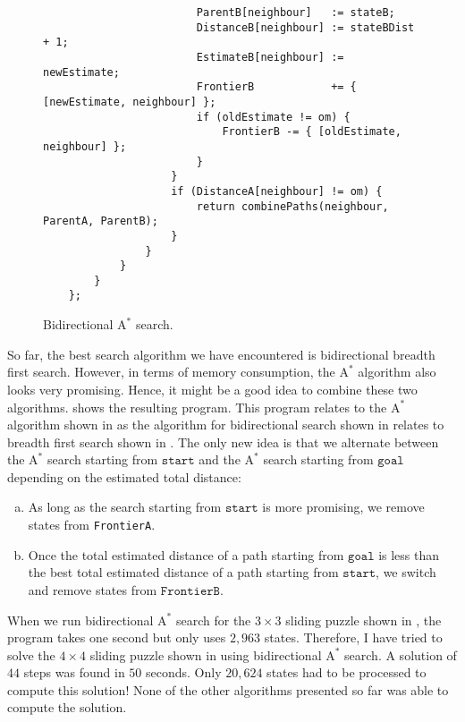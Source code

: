 \begin{figure}[!ht]
\begin{Verbatim}
                        ParentB[neighbour]   := stateB;
                        DistanceB[neighbour] := stateBDist + 1;
                        EstimateB[neighbour] := newEstimate;
                        FrontierB            += { [newEstimate, neighbour] };
                        if (oldEstimate != om) { 
                            FrontierB -= { [oldEstimate, neighbour] }; 
                        }
                    }
                    if (DistanceA[neighbour] != om) {
                        return combinePaths(neighbour, ParentA, ParentB);
                    }
                }
            }
        }
    };
\end{Verbatim}
\vspace*{-0.3cm}
\caption{Bidirectional $\mathrm{A}^*$ search.}
\label{fig:a-star-bidirectional.stlx}
\end{figure}
\noindent
So far, the best search algorithm we have encountered is bidirectional breadth first search.  However, in terms
of memory consumption, the $\mathrm{A}^*$ algorithm also looks very promising.  Hence, it might be a good idea
to combine these two algorithms.   shows the resulting program.  This program
relates to the $\mathrm{A}^*$ algorithm shown in  as the algorithm for bidirectional
search shown in  relates to breadth first search shown in .
The only new idea is that we alternate between the $\mathrm{A}^*$ search starting from $\texttt{start}$ and the
$\mathrm{A}^*$ search starting from $\texttt{goal}$ depending on the estimated total distance:
\begin{enumerate}[(a)]
\item As long as the search starting from $\texttt{start}$ is more promising, we remove states from
      \texttt{FrontierA}.
\item Once the total estimated distance of a path starting from $\texttt{goal}$ is less than the best total
      estimated distance of a path starting from $\texttt{start}$, we switch and remove states from $\texttt{FrontierB}$.
\end{enumerate}
When we run bidirectional $\mathrm{A}^*$ search for the $3 \times 3$ sliding puzzle shown in
, the program takes one second but only uses $2,963$ states.  Therefore, I have tried
to solve the $4 \times 4$ sliding puzzle shown in  using
bidirectional $\mathrm{A}^*$ search.  A solution of $44$ steps was found in $50$ seconds.
Only $20,624$ states had to be processed to compute this solution!  None of the other algorithms presented so
far was able to compute the solution.



